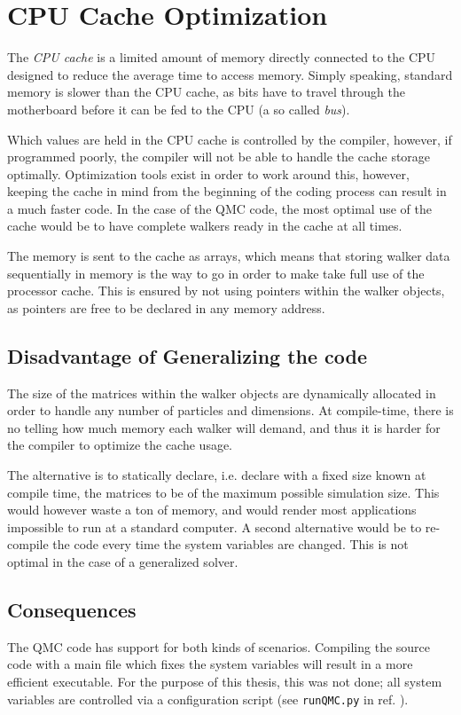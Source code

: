 \section{CPU Cache Optimization}
\label{sec:CPUcache}

The \textit{CPU cache} is a limited amount of memory directly connected to the CPU designed to reduce the average time to access memory. Simply speaking, standard memory is slower than the CPU cache, as bits have to travel through the motherboard before it can be fed to the CPU (a so called \textit{bus}). 

Which values are held in the CPU cache is controlled by the compiler, however, if programmed poorly, the compiler will not be able to handle the cache storage optimally. Optimization tools exist in order to work around this, however, keeping the cache in mind from the beginning of the coding process can result in a much faster code. In the case of the QMC code, the most optimal use of the cache would be to have complete walkers ready in the cache at all times. 

The memory is sent to the cache as arrays, which means that storing walker data sequentially in memory is the way to go in order to make take full use of the processor cache. This is ensured by not using pointers within the walker objects, as pointers are free to be declared in any memory address.

\subsection{Disadvantage of Generalizing the code}

The size of the matrices within the walker objects are dynamically allocated in order to handle any number of particles and dimensions. At compile-time, there is no telling how much memory each walker will demand, and thus it is harder for the compiler to optimize the cache usage.

The alternative is to statically declare, i.e. declare with a fixed size known at compile time, the matrices to be of the maximum possible simulation size. This would however waste a ton of memory, and would render most applications impossible to run at a standard computer. A second alternative would be to re-compile the code every time the system variables are changed. This is not optimal in the case of a generalized solver.

\subsection{Consequences}

The QMC code has support for both kinds of scenarios. Compiling the source code with a main file which fixes the system variables will result in a more efficient executable. For the purpose of this thesis, this was not done; all system variables are controlled via a configuration script (see \verb+runQMC.py+ in ref. \cite{libBorealisCode}).







